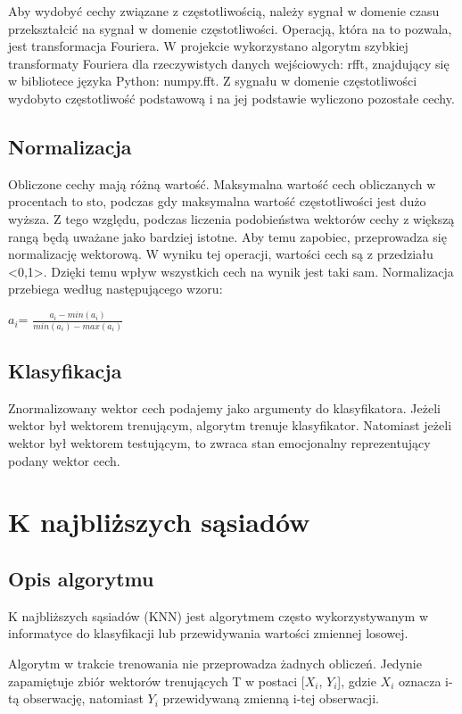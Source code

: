 \documentclass[declaration,shortabstract]{iithesis}
\begin{document}
Aby wydobyć cechy związane z częstotliwością, należy sygnał w domenie czasu przekształcić na sygnał w domenie częstotliwości. Operacją, która na to pozwala, jest transformacja Fouriera. W projekcie wykorzystano algorytm szybkiej transformaty Fouriera dla rzeczywistych danych wejściowych: rfft, znajdujący się w bibliotece języka Python: numpy.fft. Z sygnału w domenie częstotliwości wydobyto częstotliwość podstawową i na jej podstawie wyliczono pozostałe cechy.

\section{Normalizacja}

Obliczone cechy mają różną wartość. Maksymalna wartość cech obliczanych w procentach to sto, podczas gdy maksymalna wartość częstotliwości jest dużo wyższa. Z tego względu, podczas liczenia podobieństwa wektorów cechy z większą rangą będą uważane jako bardziej istotne. Aby temu zapobiec, przeprowadza się normalizację wektorową. W wyniku tej operacji, wartości cech są z przedziału \textless 0,1\textgreater. Dzięki temu wpływ wszystkich cech na wynik jest taki sam. Normalizacja przebiega według następującego wzoru:

$a_i$\textprime = $\frac{a_i - min(a_i)}{min(a_i) - max(a_i)}$

\section{Klasyfikacja}
Znormalizowany wektor cech podajemy jako argumenty do klasyfikatora. Jeżeli wektor był wektorem trenującym, algorytm trenuje klasyfikator. Natomiast jeżeli wektor był wektorem testującym, to zwraca stan emocjonalny reprezentujący podany wektor cech.

\chapter{K najbliższych sąsiadów}
\section{Opis algorytmu}
K najbliższych sąsiadów (KNN) jest algorytmem często wykorzystywanym w informatyce do klasyfikacji lub przewidywania wartości zmiennej losowej.  

Algorytm w trakcie trenowania nie przeprowadza żadnych obliczeń. Jedynie zapamiętuje zbiór wektorów trenujących T w postaci [$X_i$, $Y_i$], gdzie $X_i$ oznacza i-tą obserwację, natomiast $Y_i$ przewidywaną zmienną i-tej obserwacji.
\end{document}
